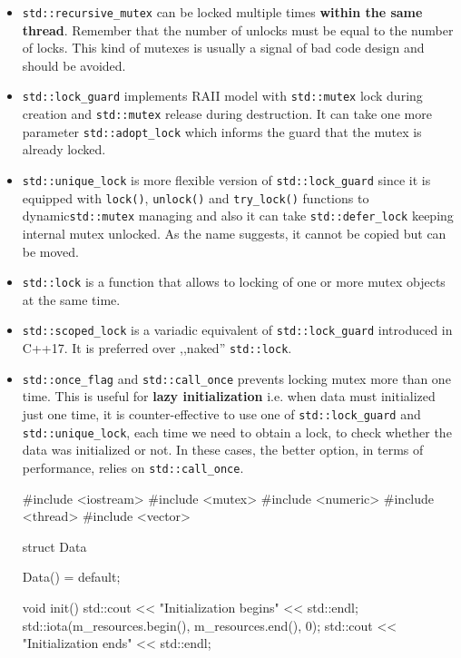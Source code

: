 \documentclass[../main]{subfiles}
\begin{document}
\begin{itemize}
    \item \texttt{std::recursive\_mutex} can be locked multiple times \textbf{within the same thread}. Remember that the number of unlocks must be equal to
    the number of locks. This kind of mutexes is usually a signal of bad code design and should be avoided.
    \item \texttt{std::lock\_guard} implements RAII model with \texttt{std::mutex} lock during creation and \texttt{std::mutex} release during destruction.
           It can take one more parameter \texttt{std::adopt\_lock} which informs the guard that the mutex is already locked.
    \item \texttt{std::unique\_lock} is more flexible version of \texttt{std::lock\_guard} since it is equipped with \texttt{lock()}, \texttt{unlock()} and
    \texttt{try\_lock()} functions to dynamic\linebreak \texttt{std::mutex} managing and also it can take \texttt{std::defer\_lock} keeping internal mutex
    unlocked. As the name suggests, it cannot be copied but can be moved.
    \item \texttt{std::lock} is a function that allows to locking of one or more mutex objects at the same time.
    \item \texttt{std::scoped\_lock} is a variadic equivalent of \texttt{std::lock\_guard} introduced in C++17. It is preferred over ,,naked'' \texttt{std::lock}.
    \item \texttt{std::once\_flag} and \texttt{std::call\_once} prevents locking mutex more than one time. This is useful for \textbf{lazy initialization} i.e.
    when data must initialized just one time, it is counter-effective to use one of \texttt{std::lock\_guard} and \texttt{std::unique\_lock},
    each time we need to obtain a lock, to check whether the data was initialized or not.
    In these cases, the better option, in terms of performance, relies on \texttt{std::call\_once}.
    \begin{Code}
        #include <iostream>
        #include <mutex>
        #include <numeric>
        #include <thread>
        #include <vector>

        struct Data
        {
            Data() = default;

            void init()
            {
                std::cout << "Initialization begins" << std::endl;
                std::iota(m_resources.begin(), m_resources.end(), 0);
                std::cout << "Initialization ends" << std::endl;
            }

}
\end{Code}
\end{itemize}
\end{document}
